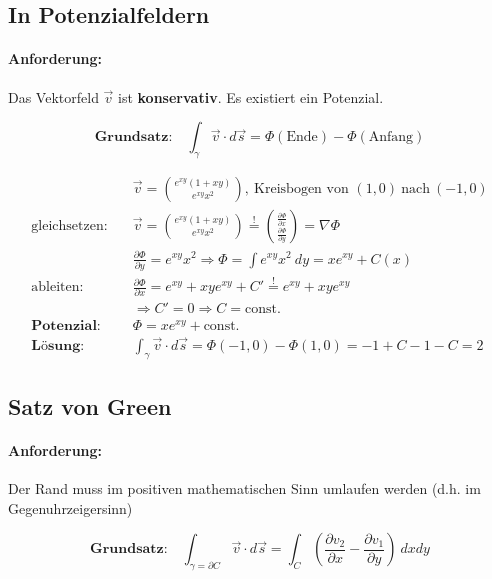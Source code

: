 \documentclass[11pt]{article}
\begin{document}
\subsection{In Potenzialfeldern}

\paragraph{Anforderung:} Das Vektorfeld $\vec{v}$ ist \textbf{konservativ}. Es existiert ein Potenzial.

\begin{equation*}
	\textbf{Grundsatz:}\quad\int_\gamma \vec{v} \cdot d\vec{s} = \Phi(\text{Ende}) - \Phi(\text{Anfang})
\end{equation*}

\begin{equation*}
\begin{split}
	& \vec{v} = \binom{e^{xy}(1 + xy)}{e^{xy}x^2},\ \text{Kreisbogen von } (1,0)\ \text{nach}\ (-1,0) \\
	\text{gleichsetzen:}\quad & \vec{v} = \binom{e^{xy}(1 + xy)}{e^{xy}x^2} \overset{!}{=} \binom{\frac{\partial\Phi}{\partial x}}{\frac{\partial\Phi}{\partial y}} = \nabla\Phi \\
	& \frac{\partial\Phi}{\partial y} = e^{xy}x^2 \Rightarrow \Phi = \int e^{xy}x^2\ dy = xe^{xy} + C(x) \\
	\text{ableiten:}\quad & \frac{\partial\Phi}{\partial x} = e^{xy} + xye^{xy} + C' \overset{!}{=} e^{xy} + xye^{xy} \\
	& \Rightarrow C' = 0 \Rightarrow C = \text{const.} \\
	\textbf{Potenzial:}\quad & \Phi = xe^{xy} + \text{const.} \\
	\textbf{L{\"o}sung:}\quad & \int_\gamma \vec{v} \cdot d\vec{s} = \Phi(-1,0) - \Phi(1,0) = -1 + C -1 - C = 2
\end{split}
\end{equation*}

\subsection{Satz von Green}

\paragraph{Anforderung:} Der Rand muss im positiven mathematischen Sinn umlaufen werden (d.h. im Gegenuhrzeigersinn)

\begin{equation*}
	\textbf{Grundsatz:}\quad\int_{\gamma = \partial C} \vec{v} \cdot d\vec{s} = \int_C (\frac{\partial v_2}{\partial x}-\frac{\partial v_1}{\partial y})\ dxdy
\end{equation*}
\end{document}
